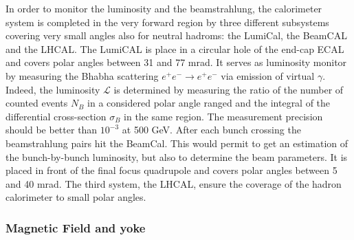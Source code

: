       In order to monitor the luminosity and the beamstrahlung, the calorimeter system is completed in the very forward region by three different subsystems covering very small angles also for neutral hadroms: the LumiCal, the BeamCAL and the \gls{LHCAL}.
      The LumiCAL is place in a circular hole of the end-cap \gls{ECAL} and covers polar angles between 31 and 77 mrad. 
      It serves as luminosity monitor by measuring the Bhabha scattering $e^+e^- \rightarrow e^+e^-$ via emission of virtual $\gamma$.
      Indeed, the luminosity $\mathcal{L}$ is determined by measuring  the ratio of the number of counted events $N_B$ in a considered polar angle ranged and the integral of the differential cross-section $\sigma_B$ in the same region.
      The measurement precision should be better than $10^{-3}$ at 500 GeV.
      After each bunch crossing the beamstrahlung pairs hit the BeamCal.
      This would permit to get an estimation of the bunch-by-bunch luminosity, but also to determine the beam parameters.
      It is placed in front of the final focus quadrupole and covers polar angles between 5 and 40 mrad.
      The third system, the \gls{LHCAL}, ensure the coverage of the hadron calorimeter to small polar angles.

      \subsubsection{Magnetic Field and yoke}
